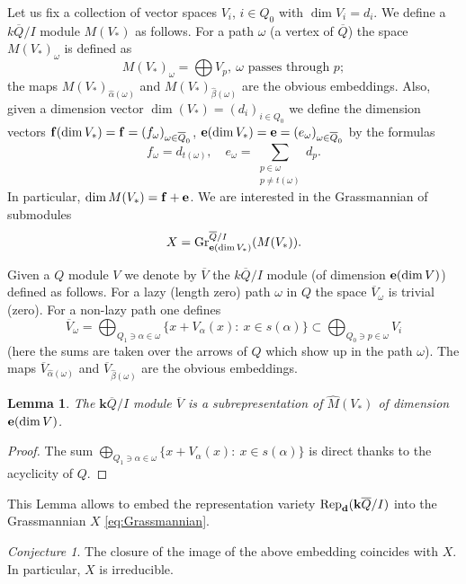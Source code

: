 \documentclass[12pt,a4paper]{amsart}
\numberwithin{equation}{section}
\newtheorem{lem}[thm]{Lemma}
\theoremstyle{remark}
\newtheorem{conj}[thm]{Conjecture}
\begin{document}
Let us fix a collection of vector spaces $V_i$, $i\in Q_0$ with $\dim V_i=d_i$. 
We define a  ${k}\overline Q/I$ module $M(V_*)$ as follows. 
For a path $\omega$ (a vertex of $\overline Q$) the space $M(V_*)_\omega$ is defined as
\[
M(V_*)_\omega = \bigoplus V_p, \ \omega \text{ passes through } p;
\]
the maps $M(V_*)_{\widehat\alpha(\omega)}$ and $M(V_*)_{\widehat\beta(\omega)}$ 
are the obvious embeddings. Also, given a dimension vector $\dim (V_*)=(d_i)_{i\in Q_0}$ we define the dimension vectors
${\bf f}(\dim V_*)={\bf f} = (f_\omega)_{\omega\in \overline Q_0}$, 
${\bf e}(\dim V_*)={\bf e} = (e_\omega)_{\omega\in \overline Q_0}$  by the formulas 
\[
f_\omega = d_{t(\omega)},\quad e_\omega =  
\sum_{\substack{p\in\omega\\ p\ne t(\omega)}} d_p. 
\]
In particular, $\dim M(V_*) = {\bf f} + {\bf e}$. We are interested in the Grassmannian of 
submodules
\begin{equation}\label{eq:Grassmannian}
X = \mathrm{Gr}_{{\bf e}(\dim V_*)}^{\overline Q/I} (M(V_*)).
\end{equation}

Given a $Q$ module $V$ we denote by $\overline V$ the ${k}\overline Q/I$ module (of dimension
${\bf e}(\dim V)$) defined as follows.
For a lazy (length zero) path  $\omega$ in $Q$ the space $\overline V_\omega$ is trivial (zero). 
For a non-lazy path one defines
\[
\overline V_\omega = \bigoplus_{Q_1\ni \alpha\in \omega} \{x+V_\alpha(x):\ x\in s(\alpha)\} \subset \bigoplus_{Q_0\ni p\in\omega} V_i 
\]
(here the sums are taken over the arrows of $Q$ which show up in the path $\omega$).
The maps $\overline V_{\widehat\alpha(\omega)}$ and $\overline V_{\widehat\beta(\omega)}$ 
are the obvious embeddings. 

\begin{lem}
The $\mathbf{k}\overline Q/I$ module $\overline V$ is a subrepresentation of $\widehat M(V_*)$ of dimension 
${\bf e}(\dim V)$. 
\end{lem}
\begin{proof}
The sum $\bigoplus_{Q_1\ni \alpha\in \omega} \{x+V_\alpha(x):\ x\in s(\alpha)\}$ is direct thanks
to the acyclicity of $Q$.
\end{proof}

This Lemma allows to embed the representation variety $\mathrm{Rep}_{{\bf d}}(\mathbf{k}\overline Q/I)$ into the Grassmannian $X$ \eqref{eq:Grassmannian}. 
\begin{conj}
The closure of the image of the above embedding coincides with $X$. In particular, $X$ is irreducible.
\end{conj}
\end{document}
